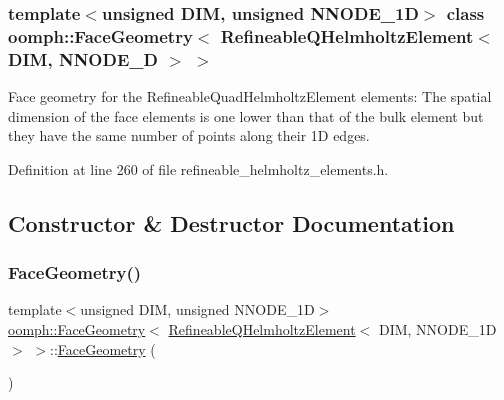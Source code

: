 \subsubsection*{template$<$unsigned D\+IM, unsigned N\+N\+O\+D\+E\+\_\+1D$>$\newline
class oomph\+::\+Face\+Geometry$<$ Refineable\+Q\+Helmholtz\+Element$<$ D\+I\+M, N\+N\+O\+D\+E\+\_\+D $>$ $>$}

Face geometry for the Refineable\+Quad\+Helmholtz\+Element elements\+: The spatial dimension of the face elements is one lower than that of the bulk element but they have the same number of points along their 1D edges. 

Definition at line 260 of file refineable\+\_\+helmholtz\+\_\+elements.\+h.



\subsection{Constructor \& Destructor Documentation}
\mbox{\label{classoomph_1_1FaceGeometry_3_01RefineableQHelmholtzElement_3_01DIM_00_01NNODE__1D_01_4_01_4_a5145146d825d1073d76fed3e0c47ef96}} 
\subsubsection{\texorpdfstring{Face\+Geometry()}{FaceGeometry()}}
{\footnotesize\ttfamily template$<$unsigned D\+IM, unsigned N\+N\+O\+D\+E\+\_\+1D$>$ \\
\hyperlink{classoomph_1_1FaceGeometry}{oomph\+::\+Face\+Geometry}$<$ \hyperlink{classoomph_1_1RefineableQHelmholtzElement}{Refineable\+Q\+Helmholtz\+Element}$<$ D\+IM, N\+N\+O\+D\+E\+\_\+1D $>$ $>$\+::\hyperlink{classoomph_1_1FaceGeometry}{Face\+Geometry} (\begin{DoxyParamCaption}{ }\end{DoxyParamCaption})\hspace{0.3cm}{\ttfamily [inline]}}



